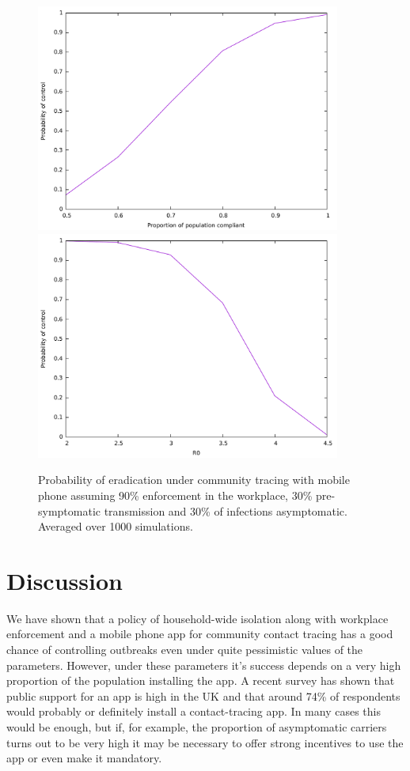 \documentclass{article}
\begin{document}
\begin{figure}
\begin{center}
\includegraphics[width = 10cm]{mobileTracing30Subclinical30pre.pdf}
\includegraphics[width = 10cm]{mobileTracing30Subclinical30preR0.pdf}
\end{center}
\caption{Probability of eradication under community tracing with mobile phone assuming 90\% enforcement in the workplace, 30\% pre-symptomatic transmission and 30\% of infections asymptomatic. Averaged over 1000 simulations.}
\label{fulltrace30}
\end{figure}

\section{Discussion}

We have shown that a policy of household-wide isolation along with workplace enforcement and a mobile phone app for community contact tracing has a good chance of controlling outbreaks even under quite pessimistic values of the parameters. However, under these parameters it's success depends on a very high proportion of the population installing the app. A recent survey\cite{abeler2020Support} has shown that public support for an app is high in the UK and that around 74\% of respondents would probably or definitely install a contact-tracing app. In many cases this would be enough, but if, for example, the proportion of asymptomatic carriers turns out to be very high it may be necessary to offer strong incentives to use the app or even make it mandatory.
\end{document}
